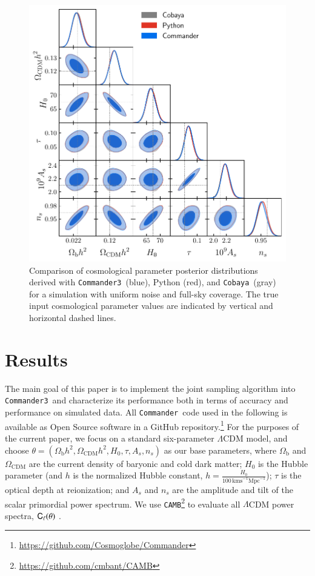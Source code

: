 \documentclass[twocolumn]{../common/aa}
\def\commander{\texttt{Commander}}
\def\commanderthree{\texttt{Commander3}}
\def\cobaya{\texttt{Cobaya}}
\def\camb{\texttt{CAMB}}
\renewcommand{\C}[0]{\tens{C}}
\begin{document}
\begin{figure}
	\centering
	\includegraphics[width=\linewidth]{figures/dist_posterior_no_mask.pdf}
	\caption{\label{fig:nomask}Comparison of cosmological parameter posterior distributions derived with \commanderthree\ (blue), Python (red), and \cobaya\ (gray) for a simulation with uniform noise and full-sky coverage. The true input cosmological parameter values are indicated by vertical and horizontal dashed lines.}
\end{figure}


\section{Results}
\label{sec:results}

The main goal of this paper is to implement the joint sampling algorithm into \commanderthree\ and characterize its performance both in terms of accuracy and performance on simulated data. All \commander\ code used in the following is available as Open Source software in a GitHub repository.\footnote{\url{https://github.com/Cosmoglobe/Commander}} For the purposes of the current paper, we focus on a standard six-parameter $\Lambda$CDM model, and choose $\theta=(\Omega_{\textrm{b}}h^2, \Omega_{\textrm{CDM}}h^2, H_0, \tau, A_s, n_s)$ as our base parameters, where $\Omega_\mathrm{b}$ and $\Omega_\mathrm{CDM}$ are the current density of baryonic and cold dark matter; $H_0$ is the Hubble parameter (and $h$ is the normalized Hubble constant, $h=\frac{H_0}{100\,\mathrm{km s}^{-1} \mathrm{Mpc}^{-1}}$); $\tau$ is the optical depth at reionization; and $A_s$ and $n_s$ are the amplitude and tilt of the scalar primordial power spectrum. We use \camb\footnote{\url{https://github.com/cmbant/CAMB}} to evaluate all $\Lambda$CDM power spectra, $\C_{\ell}(\theta)$ \citep{Lewis:1999bs}.
\end{document}
